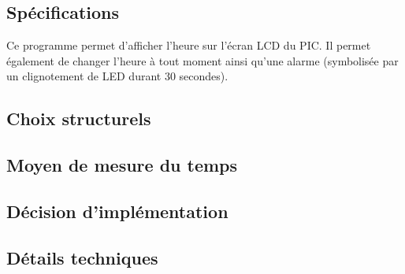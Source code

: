 \subsection*{Spécifications}

Ce programme permet d'afficher l'heure sur l'écran LCD du PIC. Il permet également de changer l'heure à tout moment ainsi qu'une alarme (symbolisée par un clignotement de LED durant 30 secondes).

\subsection*{Choix structurels}


\subsection*{Moyen de mesure du temps}


\subsection*{Décision d'implémentation}


\subsection*{Détails techniques}

